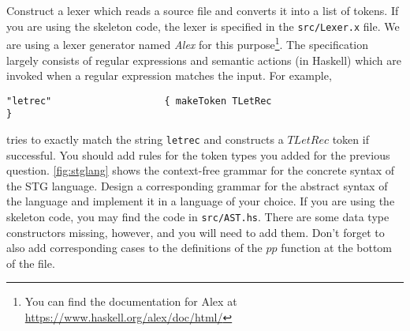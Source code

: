 \documentclass[10pt,a4paper]{exam} %
\begin{document}
\begin{questions}
\question Construct a lexer which reads a source file and converts it into a list of tokens. If you are using the skeleton code, the lexer is specified in the \texttt{src/Lexer.x} file. We are using a lexer generator named \emph{Alex} for this purpose\footnote{You can find the documentation for Alex at \url{https://www.haskell.org/alex/doc/html/}}. The specification largely consists of regular expressions and semantic actions (in Haskell) which are invoked when a regular expression matches the input. For example,
\begin{verbatim}
"letrec"                    { makeToken TLetRec                         }
\end{verbatim}
tries to exactly match the string \texttt{letrec} and constructs a $\mathit{TLetRec}$ token if successful. You should add rules for the token types you added for the previous question.
\question \autoref{fig:stglang} shows the context-free grammar for the concrete syntax of the STG language. Design a corresponding grammar for the abstract syntax of the language and implement it in a language of your choice. If you are using the skeleton code, you may find the code in \texttt{src/AST.hs}. There are some data type constructors missing, however, and you will need to add them. Don't forget to also add corresponding cases to the definitions of the $\mathit{pp}$ function at the bottom of the file.


\end{questions}
\end{document}
